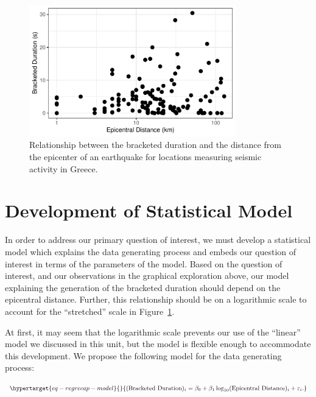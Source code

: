 \documentclass[
  letterpaper,
  DIV=11,
  numbers=noendperiod]{scrreprt}
\theoremstyle{plain}
\theoremstyle{definition}
\theoremstyle{definition}
\theoremstyle{remark}
\begin{document}
\begin{figure}

{\centering \includegraphics[width=0.8\textwidth,height=\textheight]{./images/fig-regrecap-plot-1.pdf}

}

\caption{\label{fig-regrecap-plot}Relationship between the bracketed
duration and the distance from the epicenter of an earthquake for
locations measuring seismic activity in Greece.}

\end{figure}

\hypertarget{development-of-statistical-model}{%
\section{Development of Statistical
Model}\label{development-of-statistical-model}}

In order to address our primary question of interest, we must develop a
statistical model which explains the data generating process and embeds
our question of interest in terms of the parameters of the model. Based
on the question of interest, and our observations in the graphical
exploration above, our model explaining the generation of the bracketed
duration should depend on the epicentral distance. Further, this
relationship should be on a logarithmic scale to account for the
``stretched'' scale in Figure~\ref{fig-regrecap-plot}.

At first, it may seem that the logarithmic scale prevents our use of the
``linear'' model we discussed in this unit, but the model is flexible
enough to accommodate this development. We propose the following model
for the data generating process:

\begin{equation}\protect\hypertarget{eq-regrecap-model}{}{(\text{Bracketed Duration})_i = \beta_0 + \beta_1 \log_{10}(\text{Epicentral Distance})_i + \varepsilon_i.}\label{eq-regrecap-model}\end{equation}
\end{document}
